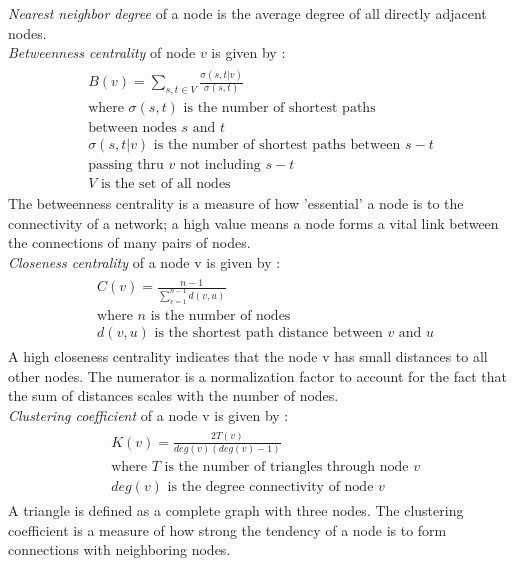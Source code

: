 \emph{Nearest neighbor degree} of a node is the average degree of all directly adjacent nodes. \\
\emph{Betweenness centrality} of node $v$ is given by \cite{brandes_faster_2001}:
\begin{equation}
	\begin{split}
		\begin{aligned}
			&B(v)=\displaystyle\sum_{s,t \in V} \frac{\sigma(s,t|v)}{\sigma(s,t)}\\
			&\text{where $\sigma(s,t)$ is the number of shortest paths}\\[-1.5ex]
			&\text{between nodes $s$ and $t$}\\
			&\sigma(s,t|v)\text{ is the number of shortest paths between $s-t$ }\\[-1.5ex]
			&\text{passing thru $v$ not including $s-t$}\\
			&\text{$V$ is the set of all nodes}
		\end{aligned}
	\end{split}
\end{equation}
The betweenness centrality is a measure of how 'essential' a node is to the connectivity of a network; a high value means a node forms a vital link between the connections of many pairs of nodes.\\
\emph{Closeness centrality} of a node v is given by \cite{freeman1979centrality}:
\begin{equation}
	\begin{split}
		\begin{aligned}
			&C(v)=\frac{n-1}{\displaystyle\sum_{v=1}^{n-1} d(v,u)} \\
			&\text{where $n$ is the number of nodes}\\
			&\text{$d(v,u)$ is the shortest path distance between $v$ and $u$}
		\end{aligned}
	\end{split}
\end{equation}
A high closeness centrality indicates that the node v has small distances to all other nodes. The numerator is a normalization factor to account for the fact that the sum of distances scales with the number of nodes.\\
\emph{Clustering coefficient} of a node v is given by \cite{saramaki2007generalizations}:
\begin{equation}
	\begin{split}
		\begin{aligned}
			&K(v)=\frac{2 T(v)}{deg(v)(deg(v)-1)} \\
			&\text{where $T$ is the number of triangles through node $v$} \\
			&\text{$deg(v)$ is the degree connectivity of node $v$}
		\end{aligned}
	\end{split}
\end{equation}
A triangle is defined as a complete graph with three nodes. The clustering coefficient is a measure of how strong the tendency of a node is to form connections with neighboring nodes. 

